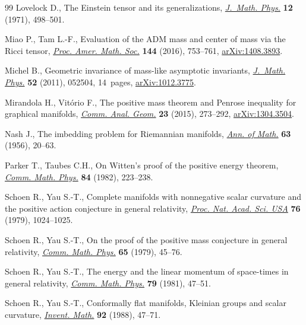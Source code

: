 \documentclass[pdftex]{sigma}
\numberwithin{equation}{section}
\begin{document}
\begin{thebibliography}{99}
Lovelock D., The {E}instein tensor and its generalizations, \href{https://doi.org/10.1063/1.1665613}{\textit{J.~Math.
 Phys.}} \textbf{12} (1971), 498--501.

Miao P., Tam L.-F., Evaluation of the {ADM} mass and center of mass via the
 {R}icci tensor, \href{https://doi.org/10.1090/proc12726}{\textit{Proc. Amer. Math. Soc.}} \textbf{144} (2016),
 753--761, \href{https://arxiv.org/abs/1408.3893}{arXiv:1408.3893}.

Michel B., Geometric invariance of mass-like asymptotic invariants,
 \href{https://doi.org/10.1063/1.3579137}{\textit{J.~Math. Phys.}} \textbf{52} (2011), 052504, 14~pages,
 \href{https://arxiv.org/abs/1012.3775}{arXiv:1012.3775}.

Mirandola H., Vit\'orio F., The positive mass theorem and {P}enrose inequality
 for graphical manifolds, \href{https://doi.org/10.4310/CAG.2015.v23.n2.a2}{\textit{Comm. Anal. Geom.}} \textbf{23} (2015),
 273--292, \href{https://arxiv.org/abs/1304.3504}{arXiv:1304.3504}.

Nash J., The imbedding problem for {R}iemannian manifolds, \href{https://doi.org/10.2307/1969989}{\textit{Ann. of
 Math.}} \textbf{63} (1956), 20--63.

Parker T., Taubes C.H., On {W}itten's proof of the positive energy theorem,
 \href{https://doi.org/10.1007/BF01208569}{\textit{Comm. Math. Phys.}} \textbf{84} (1982), 223--238.

Schoen R., Yau S.-T., Complete manifolds with nonnegative scalar curvature and
 the positive action conjecture in general relativity, \href{https://doi.org/10.1073/pnas.76.3.1024}{\textit{Proc. Nat.
 Acad. Sci. USA}} \textbf{76} (1979), 1024--1025.

Schoen R., Yau S.-T., On the proof of the positive mass conjecture in general
 relativity, \href{https://doi.org/10.1007/BF01940959}{\textit{Comm. Math. Phys.}} \textbf{65} (1979), 45--76.

Schoen R., Yau S.-T., The energy and the linear momentum of space-times in
 general relativity, \href{https://doi.org/10.1007/BF01208285}{\textit{Comm. Math. Phys.}} \textbf{79} (1981), 47--51.

Schoen R., Yau S.-T., Conformally flat manifolds, {K}leinian groups and scalar
 curvature, \href{https://doi.org/10.1007/BF01393992}{\textit{Invent. Math.}} \textbf{92} (1988), 47--71.


\end{thebibliography}
\end{document}

